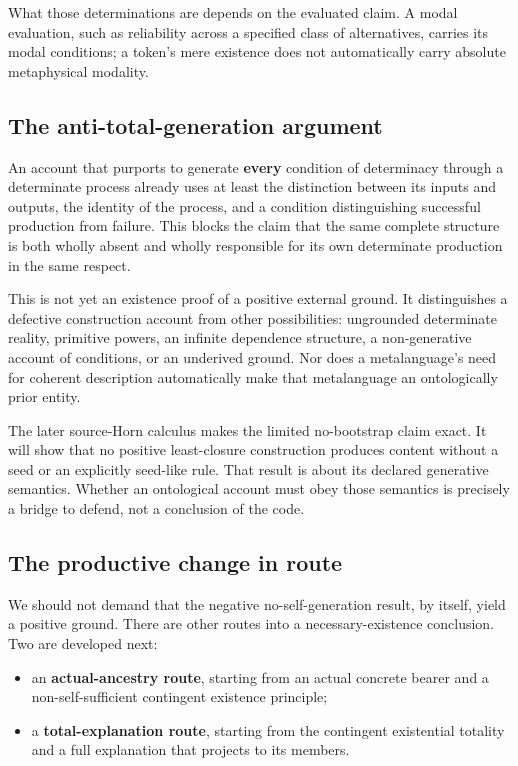 \documentclass[11pt,a4paper]{article}
\providecommand{\tightlist}{\setlength{\itemsep}{0pt}\setlength{\parskip}{0pt}}
\begin{document}
What those determinations are depends on the evaluated claim. A modal
evaluation, such as reliability across a specified class of
alternatives, carries its modal conditions; a token's mere existence
does not automatically carry absolute metaphysical modality.

\subsection{The anti-total-generation
argument}\label{the-anti-total-generation-argument}

An account that purports to generate \textbf{every} condition of
determinacy through a determinate process already uses at least the
distinction between its inputs and outputs, the identity of the process,
and a condition distinguishing successful production from failure. This
blocks the claim that the same complete structure is both wholly absent
and wholly responsible for its own determinate production in the same
respect.

This is not yet an existence proof of a positive external ground. It
distinguishes a defective construction account from other possibilities:
ungrounded determinate reality, primitive powers, an infinite dependence
structure, a non-generative account of conditions, or an underived
ground. Nor does a metalanguage's need for coherent description
automatically make that metalanguage an ontologically prior entity.

The later source-Horn calculus makes the limited no-bootstrap claim
exact. It will show that no positive least-closure construction produces
content without a seed or an explicitly seed-like rule. That result is
about its declared generative semantics. Whether an ontological account
must obey those semantics is precisely a bridge to defend, not a
conclusion of the code.

\subsection{The productive change in
route}\label{the-productive-change-in-route}

We should not demand that the negative no-self-generation result, by
itself, yield a positive ground. There are other routes into a
necessary-existence conclusion. Two are developed next:

\begin{itemize}
\tightlist
\item
  an \textbf{actual-ancestry route}, starting from an actual concrete
  bearer and a non-self-sufficient contingent existence principle;
\item
  a \textbf{total-explanation route}, starting from the contingent
  existential totality and a full explanation that projects to its
  members.
\end{itemize}
\end{document}
